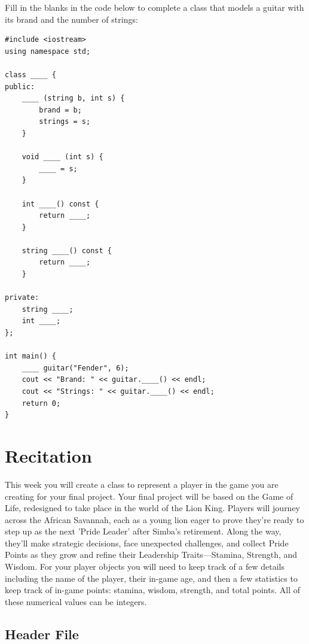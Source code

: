 \begin{problem}
Fill in the blanks in the code below to complete a class that models a guitar with its brand and the number of strings:

\begin{verbatim}
#include <iostream>
using namespace std;

class ____ {
public:
    ____ (string b, int s) {
        brand = b;
        strings = s;
    }

    void ____ (int s) {
        ____ = s;
    }

    int ____() const {
        return ____;
    }

    string ____() const {
        return ____;
    }

private:
    string ____;
    int ____;
};

int main() {
    ____ guitar("Fender", 6);
    cout << "Brand: " << guitar.____() << endl;
    cout << "Strings: " << guitar.____() << endl;
    return 0;
}
\end{verbatim}

\end{problem}



\section{Recitation}

This week you will create a class to represent a player in the game you are creating for your final project. Your final project will be based on the Game of Life, redesigned to take place in the world of the Lion King. Players will journey across the African Savannah, each as a young lion eager to prove they’re ready to step up as the next 'Pride Leader' after Simba’s retirement. Along the way, they’ll make strategic decisions, face unexpected challenges, and collect Pride Points as they grow and refine their Leadership Traits—Stamina, Strength, and Wisdom. For your player objects you will need to keep track of a few details including the name of the player, their in-game age, and then a few statistics to keep track of in-game points: stamina, wisdom, strength, and total points. All of these numerical values can be integers.

\subsection{Header File}

